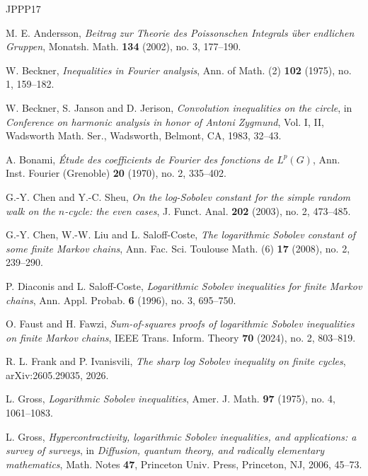 \documentclass[11pt]{amsart}
\numberwithin{equation}{section}
\theoremstyle{plain}
\theoremstyle{remark}
\begin{document}
\begin{thebibliography}{JPPP17}

M. E. Andersson,
\emph{Beitrag zur Theorie des Poissonschen Integrals \"uber endlichen Gruppen},
Monatsh. Math. \textbf{134} (2002), no. 3, 177--190.

W. Beckner,
\emph{Inequalities in Fourier analysis},
Ann. of Math. (2) \textbf{102} (1975), no. 1, 159--182.


W. Beckner, S. Janson and D. Jerison,
\emph{Convolution inequalities on the circle},
in \emph{Conference on harmonic analysis in honor of Antoni Zygmund}, Vol. I,
II, Wadsworth Math. Ser., Wadsworth, Belmont, CA, 1983, 32--43.


A. Bonami,
\emph{\'{E}tude des coefficients de Fourier des fonctions de \(L^p(G)\)},
Ann. Inst. Fourier (Grenoble) \textbf{20} (1970), no. 2, 335--402.

G.-Y. Chen and Y.-C. Sheu,
\emph{On the log-Sobolev constant for the simple random walk on the \(n\)-cycle:
the even cases},
J. Funct. Anal. \textbf{202} (2003), no. 2, 473--485.

G.-Y. Chen, W.-W. Liu and L. Saloff-Coste,
\emph{The logarithmic Sobolev constant of some finite Markov chains},
Ann. Fac. Sci. Toulouse Math. (6) \textbf{17} (2008), no. 2, 239--290.

P. Diaconis and L. Saloff-Coste,
\emph{Logarithmic Sobolev inequalities for finite Markov chains},
Ann. Appl. Probab. \textbf{6} (1996), no. 3, 695--750.

O. Faust and H. Fawzi,
\emph{Sum-of-squares proofs of logarithmic Sobolev inequalities on finite Markov chains},
IEEE Trans. Inform. Theory \textbf{70} (2024), no. 2, 803--819.


R. L. Frank and P. Ivanisvili,
\emph{The sharp log Sobolev inequality on finite cycles},
arXiv:2605.29035, 2026.

L. Gross,
\emph{Logarithmic Sobolev inequalities},
Amer. J. Math. \textbf{97} (1975), no. 4, 1061--1083.

L. Gross,
\emph{Hypercontractivity, logarithmic Sobolev inequalities, and applications: a
survey of surveys},
in \emph{Diffusion, quantum theory, and radically elementary mathematics},
Math. Notes \textbf{47}, Princeton Univ. Press, Princeton, NJ, 2006, 45--73.




\end{thebibliography}
\end{document}
